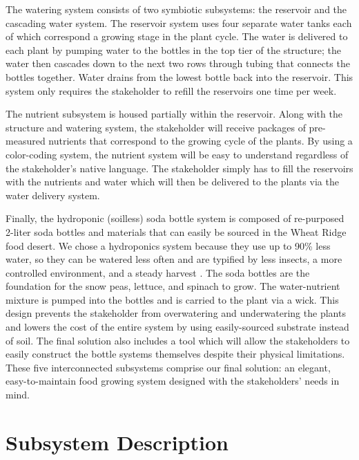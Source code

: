 \documentclass[12pt]{article}
\begin{document}
{    The watering system consists of two symbiotic subsystems: the reservoir and the cascading water
    system. The reservoir system uses four separate water tanks each of which correspond a growing
    stage in the plant cycle. The water is delivered to each plant by pumping water to the bottles
    in the top tier of the structure; the water then cascades down to the next two rows through
    tubing that connects the bottles together. Water drains from the lowest bottle back into the
    reservoir. This system only requires the stakeholder to refill the reservoirs one time per week.

    The nutrient subsystem is housed partially within the reservoir. Along with the structure and
    watering system, the stakeholder will receive packages of pre-measured nutrients that correspond
    to the growing cycle of the plants. By using a color-coding system, the nutrient system will be
    easy to understand regardless of the stakeholder’s native language. The stakeholder simply has
    to fill the reservoirs with the nutrients and water which will then be delivered to the plants
    via the water delivery system.

    Finally, the hydroponic (soilless) soda bottle system is composed of re-purposed 2-liter soda
    bottles and materials that can easily be sourced in the Wheat Ridge food desert. We chose a
    hydroponics system because they use up to 90\% less water, so they can be watered less often and
    are typified by less insects, a more controlled environment, and a steady harvest
    \cite{j-camas}. The soda bottles are the foundation for the snow peas, lettuce, and spinach to
    grow. The water-nutrient mixture is pumped into the bottles and is carried to the plant via a
    wick. This design prevents the stakeholder from overwatering and underwatering the plants and
    lowers the cost of the entire system by using easily-sourced substrate instead of soil.  The
    final solution also includes a tool which will allow the stakeholders to easily construct the
    bottle systems themselves despite their physical limitations. These five interconnected
    subsystems comprise our final solution: an elegant, easy-to-maintain food growing system
    designed with the stakeholders’ needs in mind.
}


\section{Subsystem Description}
\end{document}
